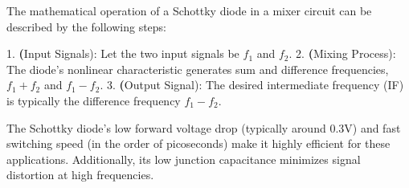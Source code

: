The mathematical operation of a Schottky diode in a mixer circuit can be described by the following steps:

1. \textbf(Input Signals): Let the two input signals be \( f_1 \) and \( f_2 \).
2. \textbf(Mixing Process): The diode's nonlinear characteristic generates sum and difference frequencies, \( f_1 + f_2 \) and \( f_1 - f_2 \).
3. \textbf(Output Signal): The desired intermediate frequency (IF) is typically the difference frequency \( f_1 - f_2 \).

The Schottky diode's low forward voltage drop (typically around 0.3V) and fast switching speed (in the order of picoseconds) make it highly efficient for these applications. Additionally, its low junction capacitance minimizes signal distortion at high frequencies.

